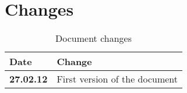 \section{Changes}

\begin{table}[h!]
\begin{tabular}{ | p{90pt} | p{270pt}  |}
\hline
\bf Date & \bf Change \\ \hline
\bf 27.02.12  &  First version of the document  \\ \hline

\end{tabular}
\caption{Document changes}
\end{table}




